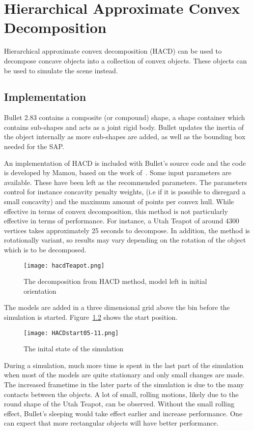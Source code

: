 \chapter{Hierarchical Approximate Convex Decomposition}\label{sec:hacd}
Hierarchical approximate convex decomposition (HACD) can be used to decompose
concave objects into a collection of convex objects. These objects can be used
to simulate the scene instead.
\section{Implementation}
Bullet 2.83 contains a
composite (or compound) shape, a shape container which contains sub-shapes and acts
as a joint rigid body. Bullet updates the inertia of the object internally as
more sub-shapes are added, as well as the bounding box needed for the SAP.

An implementation of HACD is included with Bullet's source code and the code is
developed by Mamou, based on the work of~\cite{mamou}. Some input parameters are available. These have been
left as the recommended parameters. The parameters control for instance concavity
penalty weights, (i.e if it is possible to disregard a small concavity)
and the maximum amount of points per convex hull.
While effective in terms of convex decomposition, this method is not particularly
effective in terms of performance. For instance, a Utah Teapot of around 4300 vertices
takes approximately 25 seconds to decompose. In addition, the method is rotationally
 variant, so results may vary depending on the rotation of the object which is to be decomposed.

 \begin{figure}[H]
   \centering
   \texttt{[image: hacdTeapot.png]}
   \caption{The decomposition from HACD method, model left in initial orientation}
   \label{fig:HACD}
 \end{figure}

The models are added in a three dimensional grid above the bin before the simulation
is started. Figure~\ref{fig:hacdStart} shows the start position.

\begin{figure}[H]
  \centering
  \texttt{[image: HACDstart05-11.png]}
  \caption{The inital state of the simulation}
  \label{fig:hacdStart}
\end{figure}

During a simulation, much more time is spent in the last
part of the simulation when most of the models are quite stationary and only small
changes are made. The increased frametime in the later parts of the simulation is
due to the many contacts between the objects. A lot of small, rolling motions, likely due to the round
shape of the Utah Teapot, can be observed. Without the small rolling effect, Bullet's
sleeping would take effect earlier and increase performance. One can expect that
more rectangular objects will have better performance.

